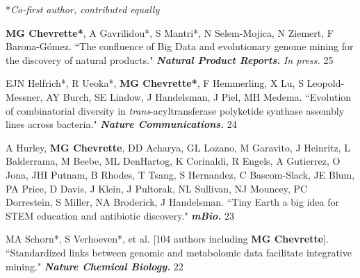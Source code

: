 


\begin{cvpubs}


\cvpub
{\hspace{-1cm} *\textit{Co-first author, contributed equally}} %
{}

\cvpub
{\textbf{MG Chevrette*}, A Gavrilidou*, S Mantri*, N Selem-Mojica, N Ziemert, F Barona-G\'{o}mez. ``The confluence of Big Data and evolutionary genome mining for the discovery of natural products." \textit{\textbf{Natural Product Reports.}} \textit{In press.}}
{25}

\end{cvpubs} \begin{cvpubs}

\cvpub
{EJN Helfrich*, R Ueoka*, \textbf{MG Chevrette*}, F Hemmerling, X Lu, S Leopold-Messner, AY Burch, SE Lindow, J Handelsman, J Piel, MH Medema. ``Evolution of combinatorial diversity in \textit{trans}-acyltransferase polyketide synthase assembly lines across bacteria." \textit{\textbf{Nature Communications.}} \textit{\textbf{}}}
{24}

\cvpub
{A Hurley, \textbf{MG Chevrette}, DD Acharya, GL Lozano, M Garavito, J Heinritz, L Balderrama, M Beebe, ML DenHartog, K Corinaldi, R Engels, A Gutierrez, O Jona, JHI Putnam, B Rhodes, T Tsang, S Hernandez, C Bascom-Slack, JE Blum, PA Price, D Davis, J Klein, J Pultorak, NL Sullivan, NJ Mouncey, PC Dorrestein, S Miller, NA Broderick, J Handelsman. ``Tiny Earth\: a big idea for STEM education and antibiotic discovery." \textit{\textbf{mBio.}} \textit{\textbf{}}}
{23}

\cvpub
{MA Schorn*, S Verhoeven*, et al. [104 authors including \textbf{MG Chevrette}]. ``Standardized links between genomic and metabolomic data facilitate integrative mining." \textit{\textbf{Nature Chemical Biology.}} \textit{\textbf{}}}
{22}


\end{cvpubs}
